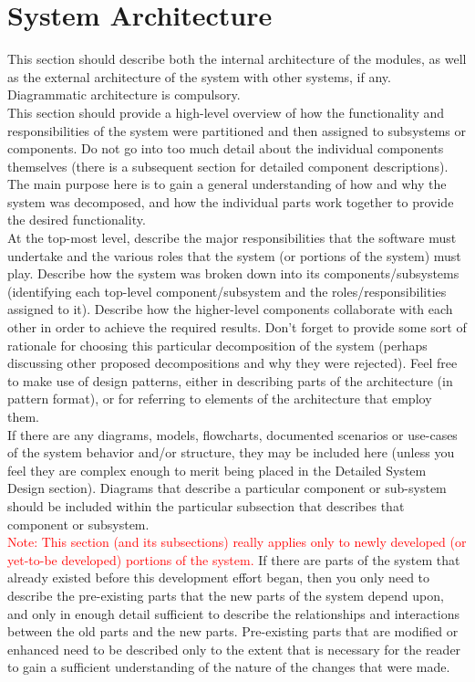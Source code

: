 \documentclass{FastFyp}
\begin{document}
\section{System Architecture}
This section should describe both the internal architecture of the modules, as well as the external architecture of the system with other systems, if any. Diagrammatic architecture is compulsory.\\
This section should provide a high-level overview of how the functionality and responsibilities of the system were partitioned and then assigned to subsystems or components. Do not go into too much detail about the individual components themselves (there is a subsequent section for detailed component descriptions). The main purpose here is to gain a general understanding of how and why the system was decomposed, and how the individual parts work together to provide the desired functionality.\\
At the top-most level, describe the major responsibilities that the software must undertake and the various roles that the system (or portions of the system) must play. Describe how the system was broken down into its components/subsystems (identifying each top-level component/subsystem and the roles/responsibilities assigned to it). Describe how the higher-level components collaborate with each other in order to achieve the required results. Don't forget to provide some sort of rationale for choosing this particular decomposition of the system (perhaps discussing other proposed decompositions and why they were rejected). Feel free to make use of design patterns, either in describing parts of the architecture (in pattern format), or for referring to elements of the architecture that employ them.\\
If there are any diagrams, models, flowcharts, documented scenarios or use-cases of the system behavior and/or structure, they may be included here (unless you feel they are complex enough to merit being placed in the Detailed System Design section). Diagrams that describe a particular component or sub-system should be included within the particular subsection that describes that component or subsystem.\\
\textcolor{red}{Note: This section (and its subsections) really applies only to newly developed (or yet-to-be developed) portions of the system.} If there are parts of the system that already existed before this development effort began, then you only need to describe the pre-existing parts that the new parts of the system depend upon, and only in enough detail sufficient to describe the relationships and interactions between the old parts and the new parts. Pre-existing parts that are modified or enhanced need to be described only to the extent that is necessary for the reader to gain a sufficient understanding of the nature of the changes that were made.
\end{document}
